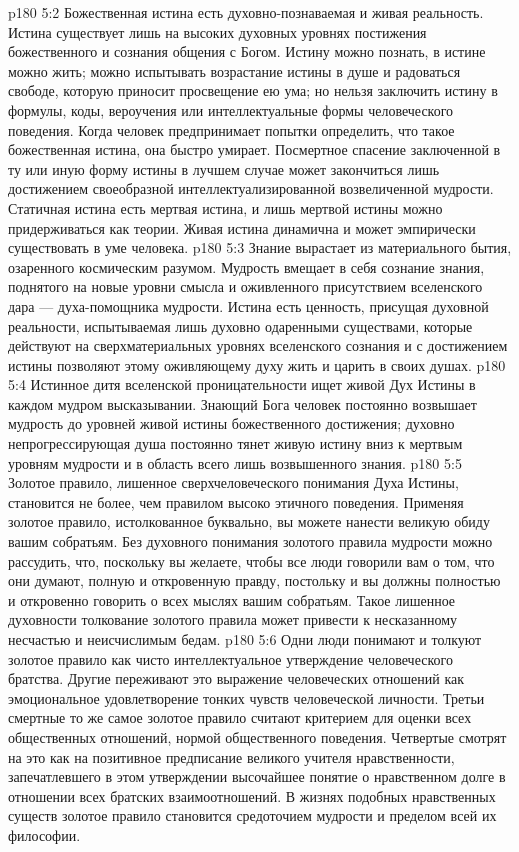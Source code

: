 \vs p180 5:2 Божественная истина есть духовно\hyp{}познаваемая и живая реальность. Истина существует лишь на высоких духовных уровнях постижения божественного и сознания общения с Богом. Истину можно познать, в истине можно жить; можно испытывать возрастание истины в душе и радоваться свободе, которую приносит просвещение ею ума; но нельзя заключить истину в формулы, коды, вероучения или интеллектуальные формы человеческого поведения. Когда человек предпринимает попытки определить, что такое божественная истина, она быстро умирает. Посмертное спасение заключенной в ту или иную форму истины в лучшем случае может закончиться лишь достижением своеобразной интеллектуализированной возвеличенной мудрости. Статичная истина есть мертвая истина, и лишь мертвой истины можно придерживаться как теории. Живая истина динамична и может эмпирически существовать в уме человека.
\vs p180 5:3 Знание вырастает из материального бытия, озаренного космическим разумом. Мудрость вмещает в себя сознание знания, поднятого на новые уровни смысла и оживленного присутствием вселенского дара --- духа\hyp{}помощника мудрости. Истина есть ценность, присущая духовной реальности, испытываемая лишь духовно одаренными существами, которые действуют на сверхматериальных уровнях вселенского сознания и с достижением истины позволяют этому оживляющему духу жить и царить в своих душах.
\vs p180 5:4 Истинное дитя вселенской проницательности ищет живой Дух Истины в каждом мудром высказывании. Знающий Бога человек постоянно возвышает мудрость до уровней живой истины божественного достижения; духовно непрогрессирующая душа постоянно тянет живую истину вниз к мертвым уровням мудрости и в область всего лишь возвышенного знания.
\vs p180 5:5 Золотое правило, лишенное сверхчеловеческого понимания Духа Истины, становится не более, чем правилом высоко этичного поведения. Применяя золотое правило, истолкованное буквально, вы можете нанести великую обиду вашим собратьям. Без духовного понимания золотого правила мудрости можно рассудить, что, поскольку вы желаете, чтобы все люди говорили вам о том, что они думают, полную и откровенную правду, постольку и вы должны полностью и откровенно говорить о всех мыслях вашим собратьям. Такое лишенное духовности толкование золотого правила может привести к несказанному несчастью и неисчислимым бедам.
\vs p180 5:6 Одни люди понимают и толкуют золотое правило как чисто интеллектуальное утверждение человеческого братства. Другие переживают это выражение человеческих отношений как эмоциональное удовлетворение тонких чувств человеческой личности. Третьи смертные то же самое золотое правило считают критерием для оценки всех общественных отношений, нормой общественного поведения. Четвертые смотрят на это как на позитивное предписание великого учителя нравственности, запечатлевшего в этом утверждении высочайшее понятие о нравственном долге в отношении всех братских взаимоотношений. В жизнях подобных нравственных существ золотое правило становится средоточием мудрости и пределом всей их философии.
